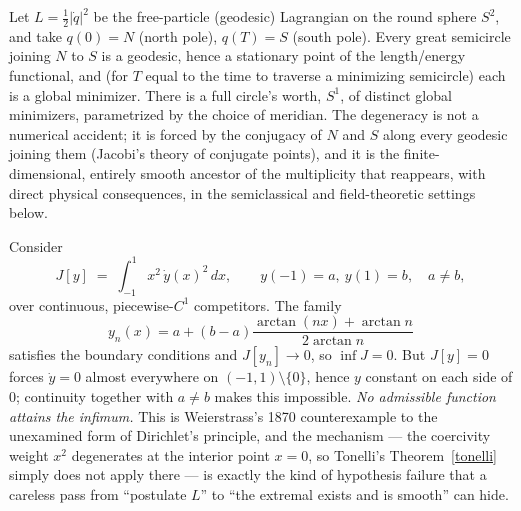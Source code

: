 \begin{example}
Let $L=\tfrac12|\dot q|^2$ be the free-particle (geodesic) Lagrangian on the
    round sphere $S^2$, and take $q(0)=N$ (north pole), $q(T)=S$ (south pole).
    Every great semicircle joining $N$ to $S$ is a geodesic, hence a stationary
    point of the length/energy functional, and (for $T$ equal to the time to
    traverse a minimizing semicircle) each is a global minimizer. There is a
    full circle's worth, $S^1$, of distinct global minimizers, parametrized by
    the choice of meridian. The degeneracy is not a numerical accident; it is
    forced by the conjugacy of $N$ and $S$ along every geodesic joining them
    (Jacobi's theory of conjugate points), and it is the finite-dimensional,
    entirely smooth ancestor of the multiplicity that reappears, with direct
    physical consequences, in the semiclassical and field-theoretic settings
    below.
\end{example}
\begin{example}
\label{weierstrass}
Consider
\[
J[y] \;=\; \int_{-1}^{1} x^2\, \dot y(x)^2\, dx, \qquad y(-1)=a,\ y(1)=b,\quad a\ne b,
\]
over continuous, piecewise-$C^1$ competitors. The family
    \[y_n(x)=a+(b-a)\dfrac{\arctan(nx)+\arctan n}{2\arctan n}\] 
    satisfies the
    boundary conditions and $J[y_n]\to 0$, so $\inf J = 0$. But $J[y]=0$ forces
    $\dot y=0$ almost everywhere on $(-1,1)\setminus\{0\}$, hence $y$ constant
    on each side of $0$; continuity together with $a\ne b$ makes this
    impossible. \emph{No admissible function attains the infimum.} This is
    Weierstrass's 1870 counterexample to the unexamined form of Dirichlet's
    principle, and the mechanism --- the coercivity weight $x^2$ degenerates at
    the interior point $x=0$, so Tonelli's Theorem~\ref{tonelli} simply
    does not apply there --- is exactly the kind of hypothesis failure that a
    careless pass from ``postulate $L$'' to ``the extremal exists and is
    smooth'' can hide.
\end{example}

